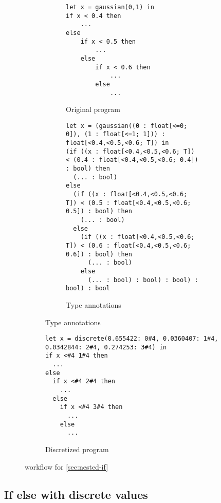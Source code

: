 \documentclass[acmsmall,screen,dvipsnames,x11names,nonacm,anonymous,review]{acmart}
\newcommand{\Slice}{\text{\scshape Slice}\xspace}
\begin{document}
\begin{figure}[ht]
\centering
\begin{subfigure}[t]{0.48\textwidth}  %
  \centering
  \begin{subfigure}[t]{\textwidth}
    \begin{lstlisting}
let x = gaussian(0,1) in 
if x < 0.4 then 
    ...
else
    if x < 0.5 then 
        ...
    else
        if x < 0.6 then 
            ...
        else
            ...
    \end{lstlisting}
    \caption{Original program}
    \label{fig:subA}
  \end{subfigure}

  \vspace{2em} %

  \begin{subfigure}[t]{\textwidth}
    \begin{lstlisting}
let x = (gaussian((0 : float[<=0; 0]), (1 : float[<=1; 1])) : float[<0.4,<0.5,<0.6; T]) in
(if ((x : float[<0.4,<0.5,<0.6; T]) < (0.4 : float[<0.4,<0.5,<0.6; 0.4]) : bool) then
  (... : bool)
else
  (if ((x : float[<0.4,<0.5,<0.6; T]) < (0.5 : float[<0.4,<0.5,<0.6; 0.5]) : bool) then
    (... : bool)
  else
    (if ((x : float[<0.4,<0.5,<0.6; T]) < (0.6 : float[<0.4,<0.5,<0.6; 0.6]) : bool) then
      (... : bool)
    else
      (... : bool) : bool) : bool) : bool) : bool
    \end{lstlisting}
    \caption{Type annotations}
    \label{fig:subC}
  \end{subfigure}
\end{subfigure}
\hfill
\begin{subfigure}[t]{0.48\textwidth}
  \begin{lstlisting}
let x = discrete(0.655422: 0#4, 0.0360407: 1#4, 
0.0342844: 2#4, 0.274253: 3#4) in
if x <#4 1#4 then
  ...
else
  if x <#4 2#4 then
    ...
  else
    if x <#4 3#4 then
      ...
    else
      ...
  \end{lstlisting}
  \caption{Discretized program}
  \label{fig:subB}
\end{subfigure}

\caption{\Slice workflow for \ref{sec:nested-if}}
\label{fig:main}
\end{figure}


\subsection{If else with discrete values}
\label{sec:discrete-if}
\end{document}
